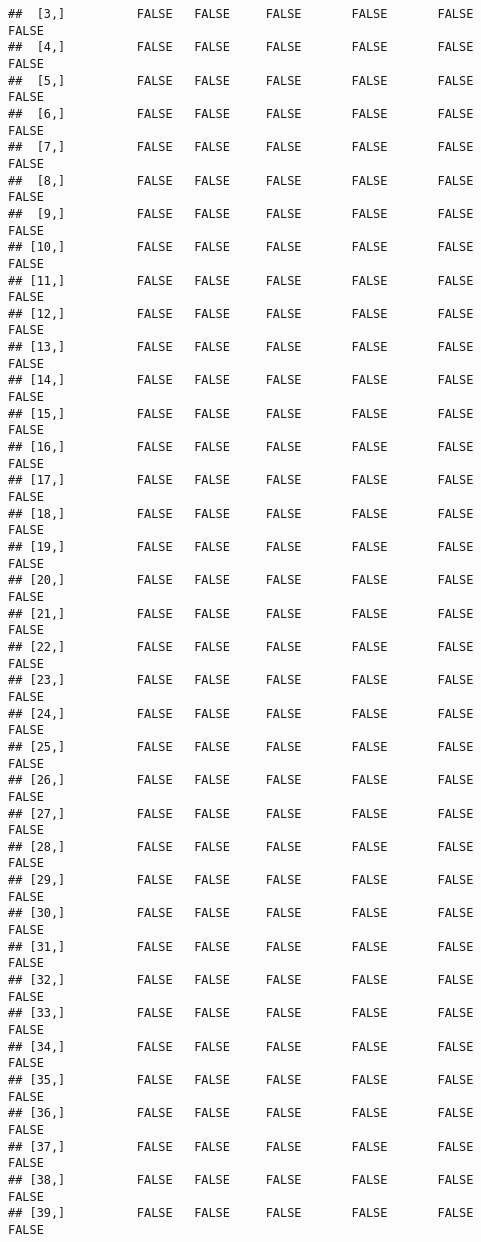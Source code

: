 \documentclass[
]{article}
\begin{document}
\begin{verbatim}
##  [3,]          FALSE   FALSE     FALSE       FALSE       FALSE FALSE
##  [4,]          FALSE   FALSE     FALSE       FALSE       FALSE FALSE
##  [5,]          FALSE   FALSE     FALSE       FALSE       FALSE FALSE
##  [6,]          FALSE   FALSE     FALSE       FALSE       FALSE FALSE
##  [7,]          FALSE   FALSE     FALSE       FALSE       FALSE FALSE
##  [8,]          FALSE   FALSE     FALSE       FALSE       FALSE FALSE
##  [9,]          FALSE   FALSE     FALSE       FALSE       FALSE FALSE
## [10,]          FALSE   FALSE     FALSE       FALSE       FALSE FALSE
## [11,]          FALSE   FALSE     FALSE       FALSE       FALSE FALSE
## [12,]          FALSE   FALSE     FALSE       FALSE       FALSE FALSE
## [13,]          FALSE   FALSE     FALSE       FALSE       FALSE FALSE
## [14,]          FALSE   FALSE     FALSE       FALSE       FALSE FALSE
## [15,]          FALSE   FALSE     FALSE       FALSE       FALSE FALSE
## [16,]          FALSE   FALSE     FALSE       FALSE       FALSE FALSE
## [17,]          FALSE   FALSE     FALSE       FALSE       FALSE FALSE
## [18,]          FALSE   FALSE     FALSE       FALSE       FALSE FALSE
## [19,]          FALSE   FALSE     FALSE       FALSE       FALSE FALSE
## [20,]          FALSE   FALSE     FALSE       FALSE       FALSE FALSE
## [21,]          FALSE   FALSE     FALSE       FALSE       FALSE FALSE
## [22,]          FALSE   FALSE     FALSE       FALSE       FALSE FALSE
## [23,]          FALSE   FALSE     FALSE       FALSE       FALSE FALSE
## [24,]          FALSE   FALSE     FALSE       FALSE       FALSE FALSE
## [25,]          FALSE   FALSE     FALSE       FALSE       FALSE FALSE
## [26,]          FALSE   FALSE     FALSE       FALSE       FALSE FALSE
## [27,]          FALSE   FALSE     FALSE       FALSE       FALSE FALSE
## [28,]          FALSE   FALSE     FALSE       FALSE       FALSE FALSE
## [29,]          FALSE   FALSE     FALSE       FALSE       FALSE FALSE
## [30,]          FALSE   FALSE     FALSE       FALSE       FALSE FALSE
## [31,]          FALSE   FALSE     FALSE       FALSE       FALSE FALSE
## [32,]          FALSE   FALSE     FALSE       FALSE       FALSE FALSE
## [33,]          FALSE   FALSE     FALSE       FALSE       FALSE FALSE
## [34,]          FALSE   FALSE     FALSE       FALSE       FALSE FALSE
## [35,]          FALSE   FALSE     FALSE       FALSE       FALSE FALSE
## [36,]          FALSE   FALSE     FALSE       FALSE       FALSE FALSE
## [37,]          FALSE   FALSE     FALSE       FALSE       FALSE FALSE
## [38,]          FALSE   FALSE     FALSE       FALSE       FALSE FALSE
## [39,]          FALSE   FALSE     FALSE       FALSE       FALSE FALSE

\end{verbatim}
\end{document}
